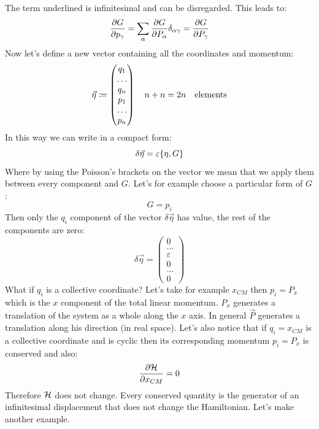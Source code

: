 The term underlined is infinitesimal and can be disregarded. This leads to:
\begin{equation}
    \pdv{G}{p_{\gamma}} = \bigsum_{\alpha} \pdv{G}{P_{\alpha}}\delta_{\alpha \gamma} = \pdv{G}{P_{\gamma}}
\end{equation}
Now let's define a new vector containing all the coordinates and momentum:
\begin{equation}
    \vec{\eta} \coloneqq \begin{pmatrix}
        q_1\\\dots\\q_n\\p_1\\\dots\\p_n
    \end{pmatrix}
    \quad n+n = 2n \quad \text{elements}
\end{equation}
In this way we can write in a compact form:
\begin{equation}
    \delta \vec{\eta} = \varepsilon \pb{\eta}{G}
\end{equation}
Where by using the Poisson's brackets on the vector we mean that we apply them between every component and $G$. Let's for example choose a particular form of $G$:
\begin{equation}
    G = p_i
\end{equation}
Then only the $q_i$ component of the vector $\delta \vec{\eta}$ has value, the rest of the components are zero:
\begin{equation}
    \delta \vec{\eta} = \begin{pmatrix}
        0\\\dots\\\varepsilon\\0\\\dots\\0
    \end{pmatrix}
\end{equation}
What if $q_i$ is a collective coordinate? Let's take for example $x_{CM}$ then $p_i = P_x$ which is the $x$ component of the total linear momentum. $P_x$ generates a translation of the system as a whole along the $x$ axis. In general $\vec{P}$ generates a translation along his direction (in real space). Let's also notice that if $q_i = x_{CM}$ is a collective coordinate and is cyclic then its corresponding momentum $p_i = P_x$ is conserved and also:
\begin{equation}
  \pdv{\hamfun}{x_{CM}}=0
\end{equation}
Therefore $\mathcal{H}$ does not change. Every conserved quantity is the generator of an infinitesimal displacement that does not change the Hamiltonian. Let's make another example.\\
